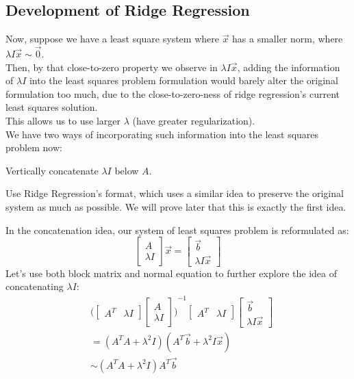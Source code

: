 \subsection{Development of Ridge Regression}
Now, suppose we have a least square system where $\vec{x}$ has a smaller norm, where $\lambda I \vec{x} \sim \vec{0}$. \\
Then, by that close-to-zero property we observe in $\lambda I \vec{x}$, adding the information of $\lambda I$ into the least squares problem formulation would barely alter the original formulation too much, due to the close-to-zero-ness of ridge regression's current least squares solution. \\
This allows us to use larger $\lambda$ (have greater regularization). \\
We have two ways of incorporating such information into the least squares problem now:
\begin{bindenum}
    \item Vertically concatenate $\lambda I$ below $A$.
    \item Use Ridge Regression's format, which uses a similar idea to preserve the original system as much as possible. We will prove later that this is exactly the first idea.
\end{bindenum}
In the concatenation idea, our system of least squares problem is reformulated as:
\[
    \begin{bmatrix} A \\ \lambda I \end{bmatrix} \vec{x} = \begin{bmatrix} \vec{b} \\ \lambda I \vec{x} \end{bmatrix}
\]
Let's use both block matrix and normal equation to further explore the idea of concatenating $\lambda I$:
\begin{align*}
    &{\bigg( \begin{bmatrix} A^T & \lambda I \end{bmatrix} \begin{bmatrix} A \\ \lambda I \end{bmatrix} \bigg)}^{-1}
    \begin{bmatrix} A^T & \lambda I \end{bmatrix} \begin{bmatrix} \vec{b} \\ \lambda I \vec{x} \end{bmatrix} \\
    &= (A^T A + \lambda^2 I) (A^T \vec{b} + \lambda^2 I \vec{x}) \\
    &\sim (A^T A + \lambda^2 I) A^T \vec{b}
\end{align*}
